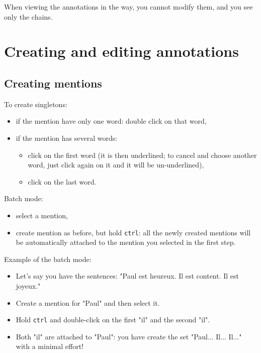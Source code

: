 \documentclass[12pt]{article}
\begin{document}
When viewing the annotations in the way, you cannot modify them, and you see
only the chains.



 \section{Creating and editing annotations}

 \subsection{Creating mentions}

\label{sec:creating-mentions}

To create singletons:
\begin{itemize}
   \item if the mention have only one word: double click on that word,
   \item if the mention has several words:
     \begin{itemize}
         \item click on the first word (it is then underlined; to cancel and
         choose another word, just click again on it and it will be
         un-underlined),
         \item click on the last word.
      \end{itemize}
\end{itemize}

Batch mode:
\begin{itemize}
   \item select a mention,
   \item create mention as before, but hold \verb|ctrl|: all the newly
   created mentions will be automatically attached to the mention you
   selected in the first step.
\end{itemize}

Example of the batch mode:
\begin{itemize}
   \item Let's say you have the sentences: "Paul est heureux.  Il est
   content. Il est joyeux."
   \item Create a mention for "Paul" and then select it.
   \item Hold \verb|ctrl| and double-click on the first "il" and the second
   "il".
   \item Both "il" are attached to "Paul": you have create the set "Paul...
   Il... Il..." with a minimal effort!
\end{itemize}
\end{document}
